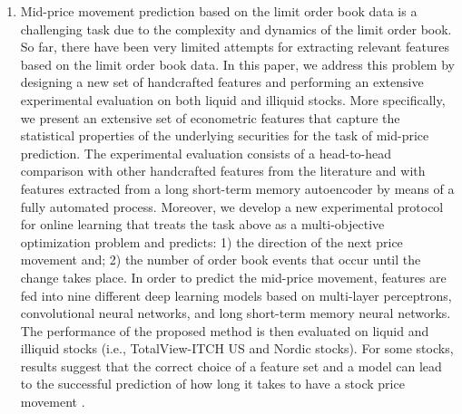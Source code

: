\documentclass[12pt,journal,compsoc]{IEEEtran}
\begin{document}
\begin{enumerate}
	\item Mid-price movement prediction based on the limit order book data is a challenging task due to the complexity and dynamics of the limit order book. So far, there have been very limited attempts for extracting relevant features based on the limit order book data. In this paper, we address this problem by designing a new set of handcrafted features and performing an extensive experimental evaluation on both liquid and illiquid stocks. More specifically, we present an extensive set of econometric features that capture the statistical properties of the underlying securities for the task of mid-price prediction. The experimental evaluation consists of a head-to-head comparison with other handcrafted features from the literature and with features extracted from a long short-term memory autoencoder by means of a fully automated process. Moreover, we develop a new experimental protocol for online learning that treats the task above as a multi-objective optimization problem and predicts: 1) the direction of the next price movement and; 2) the number of order book events that occur until the change takes place. In order to predict the mid-price movement, features are fed into nine different deep learning models based on multi-layer perceptrons, convolutional neural networks, and long short-term memory neural networks. The performance of the proposed method is then evaluated on liquid and illiquid stocks (i.e., TotalView-ITCH US and Nordic stocks). For some stocks, results suggest that the correct choice of a feature set and a model can lead to the successful prediction of how long it takes to have a stock price movement \cite{ntakaris2019feature}.
	

\end{enumerate}
\end{document}
